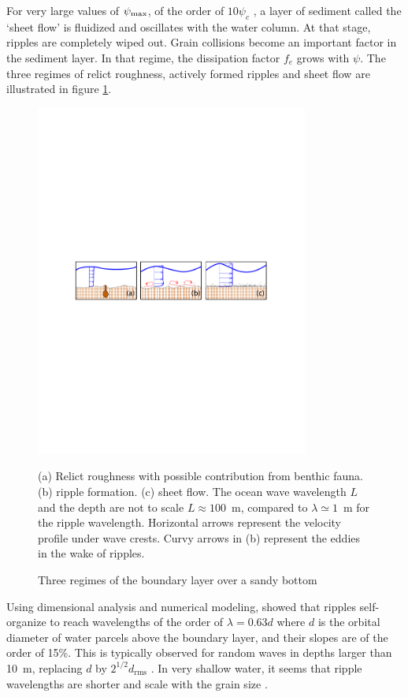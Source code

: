 For very large values of  $\psi _{\rm max}$, of the order of  $10 \psi _{c}$
\citep{Li&Amos1999}, a layer of sediment called the `sheet flow' is fluidized and oscillates with the water column. At that stage, 
ripples are completely wiped out. Grain collisions become an important factor in the sediment layer. 
In that regime, the dissipation factor $f_{e}$ grows with 
$\psi$. The three regimes of relict roughness, actively formed ripples and sheet flow are illustrated in  figure \ref{fig three regimes}.
\begin{figure}
\centerline{\includegraphics[width=0.8\textwidth]{FIGS_CH_BBL/introduction_fig2.pdf}}
  \caption{Three regimes of the boundary layer over a sandy bottom}{(a) Relict roughness with possible contribution from benthic fauna.
  (b) ripple formation. (c)
sheet flow. The ocean wave wavelength $L$ and the depth are not to scale $L\approx 100$~m, compared to $\lambda \simeq 1$~m
for the ripple wavelength. Horizontal arrows represent the velocity profile under wave crests. Curvy arrows in  (b) 
represent the eddies in the wake of ripples.} \label{fig three regimes}
\end{figure}

Using dimensional analysis and numerical modeling, \cite{Andersen1999} showed that ripples 
self-organize to reach wavelengths of the order of 
$\lambda=0.63d$ where  $d$ is the orbital diameter of water parcels above the boundary layer, and their slopes are of the order of 15\%. 
This is typically observed for random waves in depths larger than 10~m, replacing  $d$ by 
$2^{1/2}d_{\mathrm{rms}}$ \citep{Traykovski&al.1999,Ardhuin&al.2002}. In very shallow water, it seems that ripple wavelengths are shorter and scale 
with the grain size \citep{Dingler1974,Wiberg&Harris1994}.

